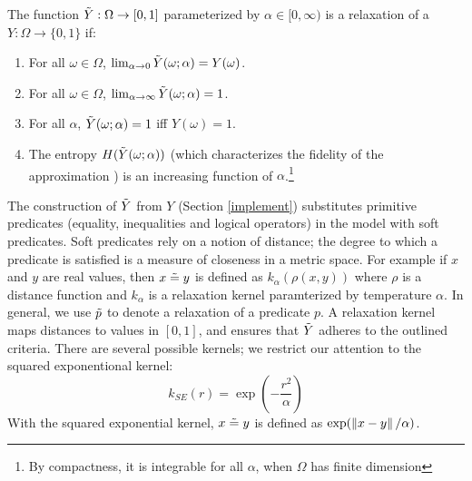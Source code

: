 
\begin{definition}
The function $\tilde{Y} : \Omega \to [0, 1]$ parameterized by $\alpha \in [0, \infty)$ is a relaxation of a $Y: \Omega \to \{0, 1\}$ if:
\begin{enumerate}[label=(\roman*)]
	\label{def:temp}
	\item For all $\omega \in \Omega$, $\lim_{\alpha \to 0}\tilde{Y}(\omega; \alpha) = Y(\omega)$.
	\item For all $\omega \in \Omega$, $\lim_{\alpha \to \infty}\tilde{Y}(\omega; \alpha) = 1$.

    \item For all $\alpha$, $\tilde{Y}(\omega; \alpha) = 1$ iff $Y(\omega) = 1$.
    \item The entropy $H(\tilde{Y}(\omega; \alpha))$ (which characterizes the fidelity of the approximation ) is an increasing function of $\alpha$.\footnote
    {By compactness, it is integrable for all $\alpha$, when $\Omega$ has finite dimension}
\end{enumerate}
\end{definition}


The construction of $\tilde{Y}$ from $Y$ (Section \ref{implement}) substitutes primitive predicates (equality, inequalities and logical operators) in the model with soft predicates.  Soft predicates rely on a notion of distance; the degree to which a predicate is satisfied is a measure of closeness in a metric space. 
For example if $x$ and $y$ are real values, then $x \mathrel{\tilde{=}} y$ is defined as $k_\alpha(\rho(x, y))$ where $\rho$ is a distance function and $k_\alpha$ is a relaxation kernel paramterized by temperature $\alpha$.
In general, we use $\mathrel{\tilde{p}}$ to denote a relaxation of a predicate $p$.
A relaxation kernel maps distances to values in $[0, 1]$, and ensures that $\tilde{Y}$ adheres to the outlined criteria.
There are several possible kernels; we restrict our attention to the squared exponentional kernel:
\begin{equation}
k_{SE}(r) = \exp\left(-\frac{r^2}{\alpha}\right)
\end{equation}
With the squared exponential kernel, $x \mathrel{\tilde{=}} y$ is defined as $\exp(\left\|{{x - y}}\right\|/\alpha)$.

